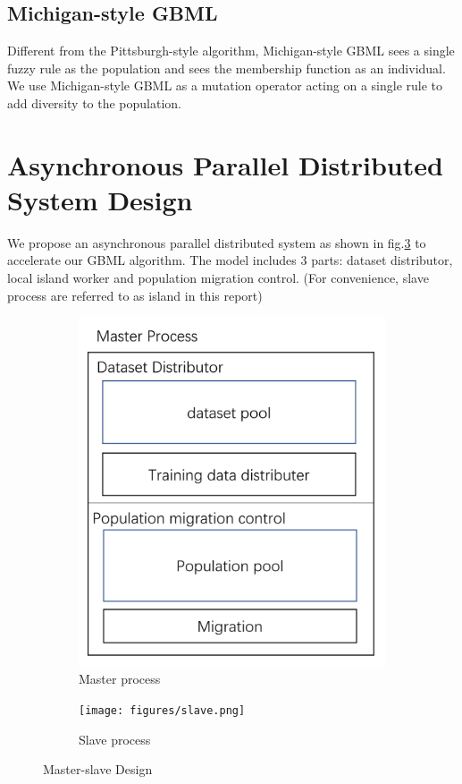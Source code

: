 \documentclass[conference]{IEEEtran}
\begin{document}
	 \subsection{Michigan-style GBML}
	 
   Different from the Pittsburgh-style algorithm, Michigan-style GBML sees a single fuzzy rule as the population and sees the membership function as an individual. We use Michigan-style GBML as a mutation operator acting on a single rule to add diversity to the population. 
   
  
   
  \section{Asynchronous Parallel Distributed System Design}
  We propose an asynchronous parallel distributed system as shown in fig.\ref{fig:fig} to accelerate our GBML algorithm. The model includes 3 parts: dataset distributor, local island worker and population migration control. (For convenience, slave process are referred to as island in this report)

  
    \begin{figure}[H]
    \centering
    \begin{subfigure}{0.45\linewidth}
      \centering
      \includegraphics[width=0.9\linewidth]{figures/master.png}
      \caption{Master process}
      \label{fig:sfig1}
    \end{subfigure}%
    \begin{subfigure}{0.45\linewidth}
      \centering
      \texttt{[image: figures/slave.png]}
      \caption{Slave process}
      \label{fig:sfig2}
    \end{subfigure}
    
    \caption{Master-slave Design}
    \label{fig:fig}
    \end{figure}
\end{document}

